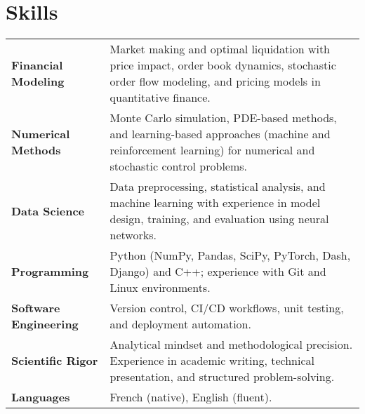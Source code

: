 \documentclass[a4paper,12pt]{article}
\begin{document}
	\section{Skills}
	\begin{tabularx}{\linewidth}{@{}l X@{}}
		\textbf{Financial Modeling} & Market making and optimal liquidation with price impact, order book dynamics, stochastic order flow modeling, and pricing models in quantitative finance. \\
		\textbf{Numerical Methods} & Monte Carlo simulation, PDE-based methods, and learning-based approaches (machine and reinforcement learning) for numerical and stochastic control problems. \\
		\textbf{Data Science} & Data preprocessing, statistical analysis, and machine learning with experience in model design, training, and evaluation using neural networks. \\
		\textbf{Programming} & Python (NumPy, Pandas, SciPy, PyTorch, Dash, Django) and C++; experience with Git and Linux environments. \\
		\textbf{Software Engineering} & Version control, CI/CD workflows, unit testing, and deployment automation. \\
		\textbf{Scientific Rigor} & Analytical mindset and methodological precision. Experience in academic writing, technical presentation, and structured problem-solving. \\
		\textbf{Languages} & French (native), English (fluent).
	\end{tabularx}
\end{document}
